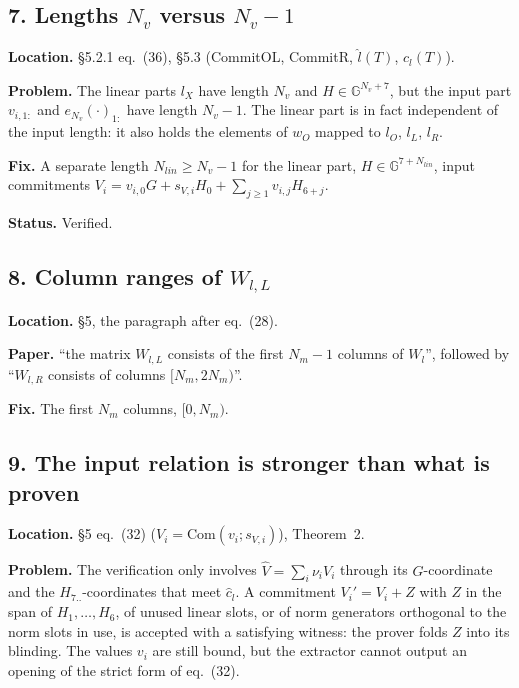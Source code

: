 \documentclass[11pt,a4paper]{article}
\newcommand{\G}{\mathbb{G}}
\newcommand{\status}[1]{\par\noindent\textbf{Status.} #1}
\newcommand{\loc}[1]{\par\noindent\textbf{Location.} #1}
\begin{document}
\subsection*{7. Lengths $N_v$ versus $N_v - 1$}
\loc{\S5.2.1 eq.~(36), \S5.3 (CommitOL, CommitR, $\hat l(T)$, $\hat c_l(T)$).}

\noindent\textbf{Problem.} The linear parts $l_X$ have length $N_v$ and $H \in \G^{N_v+7}$, but
the input part $v_{i,1:}$ and $e_{N_v}(\cdot)_{1:}$ have length $N_v - 1$. The linear part is in
fact independent of the input length: it also holds the elements of $w_O$ mapped to $l_O$, $l_L$,
$l_R$.

\noindent\textbf{Fix.} A separate length $N_{lin} \ge N_v - 1$ for the linear part,
$H \in \G^{7 + N_{lin}}$, input commitments
$V_i = v_{i,0} G + s_{V,i} H_0 + \sum_{j \ge 1} v_{i,j} H_{6+j}$.
\status{Verified.}

\subsection*{8. Column ranges of $W_{l,L}$}
\loc{\S5, the paragraph after eq.~(28).}

\noindent\textbf{Paper.} ``the matrix $W_{l,L}$ consists of the first $N_m - 1$ columns of
$W_l$'', followed by ``$W_{l,R}$ consists of columns $[N_m, 2N_m)$''.

\noindent\textbf{Fix.} The first $N_m$ columns, $[0, N_m)$.

\subsection*{9. The input relation is stronger than what is proven}
\loc{\S5 eq.~(32) ($V_i = \mathrm{Com}(v_i; s_{V,i})$), Theorem~2.}

\noindent\textbf{Problem.} The verification only involves $\hat V = \sum_i \nu_i V_i$ through its
$G$-coordinate and the $H_{7..}$-coordinates that meet $\hat c_l$. A commitment
$V_i' = V_i + Z$ with $Z$ in the span of $H_1, \dots, H_6$, of unused linear slots, or of norm
generators orthogonal to the norm slots in use, is accepted with a satisfying witness: the
prover folds $Z$ into its blinding. The values $v_i$ are still bound, but the extractor cannot
output an opening of the strict form of eq.~(32).
\end{document}
